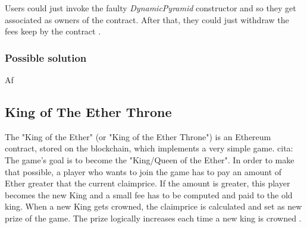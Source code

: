 Users could just invoke the faulty \textit{DynamicPyramid} constructor and so they get associated as owners of the contract. After that, they could just withdraw the fees keep by the contract \cite{rubixi1}. 

\subsubsection{Possible solution}
Af


\subsection{King of The Ether Throne}
The "King of the Ether" (or "King of the Ether Throne") is an Ethereum contract, stored on the blockchain, which implements a very simple game. cita: %
The game's goal is to become the "King/Queen of the Ether". In order to make that possible, a player who wants to join the game has to pay an amount of Ether greater that the current claimprice. If the amount is greater, this player becomes the new King and a small fee has to be computed and paid to the old king. 
When a new King gets crowned, the claimprice is calculated and set as new prize of the game. The prize logically increases each time a new king is crowned \cite{paper2}. \\

